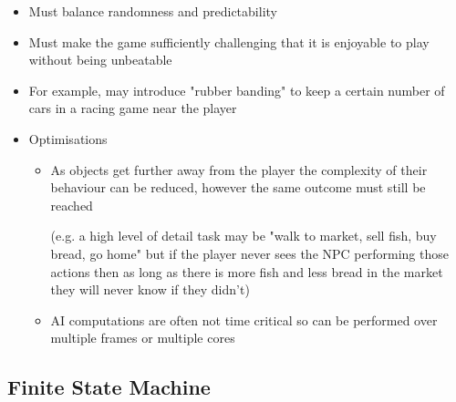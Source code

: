 \documentclass[a4paper]{article}
\begin{document}
\begin{itemize}
  \item
    Must balance randomness and predictability

  \item
    Must make the game sufficiently challenging that it is enjoyable to play
    without being unbeatable

  \item
    For example, may introduce "rubber banding" to keep a certain number of cars
    in a racing game near the player

  \item
    Optimisations
    \begin{itemize}
      \item
        As objects get further away from the player the complexity of their
        behaviour can be reduced, however the same outcome must still be reached

        (e.g. a high level of detail task may be "walk to market, sell fish, buy
        bread, go home" but if the player never sees the NPC performing those
        actions then as long as there is more fish and less bread in the market
        they will never know if they didn't)

      \item
        AI computations are often not time critical so can be performed over
        multiple frames or multiple cores

    \end{itemize}

\end{itemize}

\subsection{Finite State Machine}
\end{document}
